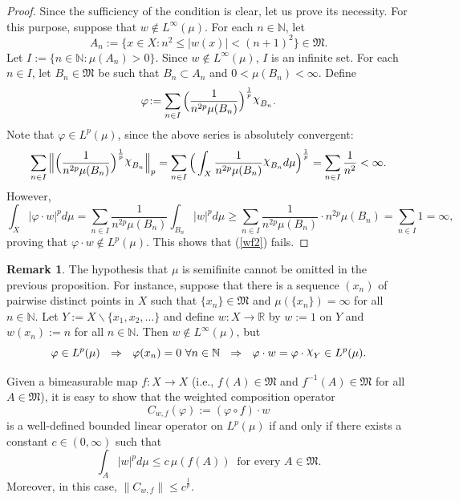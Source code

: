 \documentclass[12pt]{amsart}
\theoremstyle{theorem}
\theoremstyle{definition}
\newtheorem{remark}[theorem]{Remark}
\theoremstyle{remark} \theoremstyle{question} \theoremstyle{example}
\newcommand{\N}{\mathbb{N}}
\newcommand{\R}{\mathbb{R}}
\newcommand{\fM}{\mathfrak{M}}
\DeclareRobustCommand{\rchi}{{\mathpalette\irchi\relax}}
\newcommand{\irchi}[2]{\raisebox{\depth}{$#1\chi$}}
\begin{document}
\begin{proof}
Since the sufficiency of the condition is clear, let us prove its necessity. 
For this purpose, suppose that $w \not\in L^\infty(\mu)$. For each $n \in \N$, let
\[
A_n\!:= \{x \in X : n^2 \leq |w(x)| < (n+1)^2\} \in \fM.
\]
Let $I\!:= \{n \in \N : \mu(A_n) > 0\}$. Since $w \not\in L^\infty(\mu)$, $I$ is an infinite set.
For each $n \in I$, let $B_n \in \fM$ be such that $B_n \subset A_n$ and $0 < \mu(B_n) < \infty$. Define
\[
\varphi\!:= \sum_{n \in I} \Big(\frac{1}{n^{2p} \mu(B_n)}\Big)^\frac{1}{p} \rchi_{B_n}.
\]
Note that $\varphi \in L^p(\mu)$, since the above series is absolutely convergent:
\[
\sum_{n \in I} \Big\|\Big(\frac{1}{n^{2p} \mu(B_n)}\Big)^\frac{1}{p} \rchi_{B_n}\Big\|_p
= \sum_{n \in I} \Big(\int_X \frac{1}{n^{2p} \mu(B_n)} \rchi_{B_n} d\mu\Big)^\frac{1}{p}
= \sum_{n \in I} \frac{1}{n^2} < \infty.
\]
However,
\[
\int_X |\varphi \cdot w|^p d\mu = \sum_{n \in I} \frac{1}{n^{2p} \mu(B_n)} \int_{B_n} |w|^p d\mu
\geq \sum_{n \in I} \frac{1}{n^{2p} \mu(B_n)} \cdot n^{2p} \mu(B_n)
= \sum_{n \in I} 1 = \infty,
\]
proving that $\varphi \cdot w \not\in L^p(\mu)$. This shows that (\ref{wf2}) fails.
\end{proof}

\begin{remark}
The hypothesis that $\mu$ is semifinite cannot be omitted in the previous proposition. 
For instance, suppose that there is a sequence $(x_n)$ of pairwise distinct points in $X$ such that 
$\{x_n\} \in \fM$ and $\mu(\{x_n\}) = \infty$ for all $n \in \N$. 
Let $Y\!:= X \backslash \{x_1,x_2,\ldots\}$ and define $w : X \to \R$ by $w\!:= 1$ on $Y$ and $w(x_n)\!:= n$ for all $n \in \N$. 
Then $w \not\in L^\infty(\mu)$, but
\[
\varphi \in L^p(\mu) \ \ \Rightarrow \ \ \varphi(x_n) = 0 \ \forall n \in \N \ \ \Rightarrow \ \ \varphi \cdot w = \varphi \cdot \rchi_Y \in L^p(\mu).
\]
\end{remark}

Given a bimeasurable map $f : X \to X$ (i.e., $f(A) \in \fM$ and $f^{-1}(A) \in \fM$ for all $A \in \fM$), it is easy to show that the weighted composition operator
\[
C_{w,f}(\varphi)\!:= (\varphi \circ f) \cdot w
\]
is a well-defined bounded linear operator on $L^p(\mu)$ if and only if there exists a constant $c \in (0,\infty)$ such that
\begin{equation}\label{condition}
\int_A |w|^p d\mu \leq c\, \mu(f(A)) \ \textrm{ for every } A \in \fM.
\end{equation}
Moreover, in this case, $\|C_{w,f}\| \leq c^\frac{1}{p}$.
\end{document}
